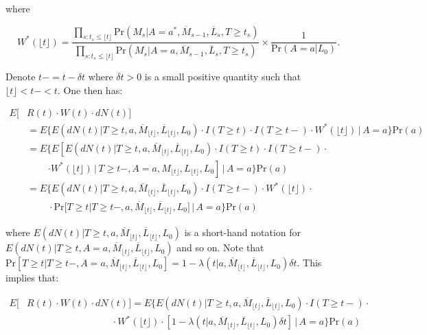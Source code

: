 \documentclass[AMA,STIX1COL]{WileyNJD-v2}
\newcommand{\pr}{\text{Pr}}
\begin{document}
where 

\begingroup
\fontsize{10pt}{10pt}\selectfont
\[W^*(\lfloor t \rfloor) =  \frac{\prod_{s:t_s\le \lfloor t \rfloor} \pr(M_{s}|A = a^*, \overline{M}_{s - 1}, \overline{L}_{s}, T\ge t_s)}{\prod_{s:t_s\le \lfloor t \rfloor} \pr(M_{s}|A = a, \overline{M}_{s - 1}, \overline{L}_{s}, T\ge t_s)}\times \frac{1}{\pr(A=a|L_{0})}.\] 
\endgroup

Denote $t-=t - \delta t$ where $\delta t > 0$ is a small positive quantity such that $\lfloor t \rfloor < t-<t$. One then has:

\begingroup
\fontsize{10pt}{10pt}\selectfont
\begin{align*}
E[&R(t)\cdot W(t)\cdot dN(t)] \\
&= E \bigg\{E(dN(t)| T\ge t, a, \overline{M}_{\lfloor t \rfloor},\overline{L}_{\lfloor t \rfloor}, L_{0})\cdot I(T\ge t)\cdot I(T\ge t-)\cdot W^*(\lfloor t \rfloor)\,\bigg\rvert\, A=a \bigg\}\pr(a)\\
&= E \bigg\{E\left[E(dN(t) | T\ge t, a, \overline{M}_{\lfloor t \rfloor},\overline{L}_{\lfloor t \rfloor}, L_{0})\cdot I(T\ge t)\cdot I(T\ge t-)\cdot\right.\\
&~~~~~~~~~~ \left.\cdot W^*(\lfloor t \rfloor)\,\bigg\rvert\, T\ge t-,A=a,M_{\lfloor t \rfloor},L_{\lfloor t \rfloor},L_0\right]\,\bigg\rvert\, A=a \bigg\}\pr(a)\\
&=E \bigg\{E(dN(t) | T\ge t, a,\overline{M}_{\lfloor t \rfloor},\overline{L}_{\lfloor t \rfloor}, L_{0})\cdot I(T\ge t-)\cdot W^*(\lfloor t \rfloor)\cdot\\
&~~~~~~~~~~ \cdot \pr\bigg[T\ge t|T\ge t-,a,\overline{M}_{\lfloor t \rfloor},\overline{L}_{\lfloor t \rfloor},L_0\bigg] \,\bigg\rvert\, A=a\bigg\}\pr(a)
\end{align*}
\endgroup

where $E(dN(t)| T\ge t, a, \overline{M}_{\lfloor t \rfloor},\overline{L}_{\lfloor t \rfloor}, L_{0})$ is a short-hand notation for $E(dN(t)| T\ge t, A=a, \overline{M}_{\lfloor t \rfloor},\overline{L}_{\lfloor t \rfloor}, L_{0})$ and so on. Note that $\pr\left[T\ge t|T\ge t-,A=a,\overline{M}_{\lfloor t \rfloor},\overline{L}_{\lfloor t \rfloor},L_0\right] = 1 - \lambda(t|a,\overline{M}_{\lfloor t \rfloor},\overline{L}_{\lfloor t \rfloor},L_0)\delta t$. This implies that:

\begingroup
\fontsize{10pt}{10pt}\selectfont
\begin{align*}
E[&R(t)\cdot W(t)\cdot dN(t)] =E \bigg\{E(dN(t) | T\ge t, a,\overline{M}_{\lfloor t \rfloor},\overline{L}_{\lfloor t \rfloor}, L_{0})\cdot I(T\ge t-)\cdot \\
&~~~~~~~~~~~~~~~~~~~~~~~~~~~~~~~~~~~~~~~~\cdot W^*(\lfloor t \rfloor)\cdot \left[ 1 - \lambda(t|a,\overline{M}_{\lfloor t \rfloor},\overline{L}_{\lfloor t \rfloor},L_0)\delta t\right] \,\bigg\rvert\,A=a \bigg\}\pr(a)
\end{align*}
\endgroup
\end{document}

